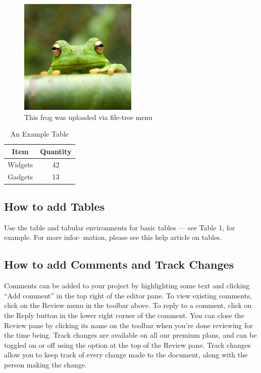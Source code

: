 \documentclass{article}
\begin{document}
\begin{figure}
	\centering
	\includegraphics[width=0.5\textwidth]{frog.jpg}
	\caption{This frog was uploaded via file-tree menu}
	
\end{figure}
\begin{table}
	\centering
	\begin{tabular}{c|c}
		\hline
		Item & Quantity\\
		\hline
		Widgets & 42\\
		Gadgets & 13\\
			\end{tabular}
		
		\caption{An Example Table}
		\label{fig:tab}
		
		
		
	
\end{table}

\subsection{How to add Tables}
Use the table and tabular environments for basic tables — see Table 1, for example. For more infor-
mation, please see this help article on tables.

\subsection{How to add Comments and Track Changes}
Comments can be added to your project by highlighting some text and clicking “Add comment” in
the top right of the editor pane. To view existing comments, click on the Review menu in the toolbar
above. To reply to a comment, click on the Reply button in the lower right corner of the comment.
You can close the Review pane by clicking its name on the toolbar when you’re done reviewing for the
time being.
Track changes are available on all our premium plans, and can be toggled on or off using the option
at the top of the Review pane. Track changes allow you to keep track of every change made to the
document, along with the person making the change.
\end{document}
